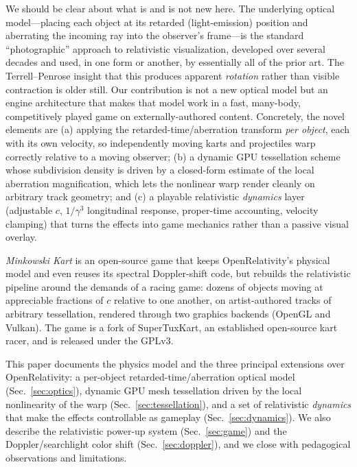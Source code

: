 \documentclass[aip,amsmath,amssymb,reprint,nofootinbib]{revtex4-2}
\begin{document}
We should be clear about what is and is not new here. The underlying optical
model---placing each object at its retarded (light-emission) position and
aberrating the incoming ray into the observer's frame---is the standard
``photographic'' approach to relativistic visualization, developed over several
decades and used, in one form or another, by essentially all of the prior
art.\cite{Hsiung1990,Weiskopf2000,Kraus2008,Savage2007,Sherin2016} The
Terrell--Penrose insight that this produces apparent \emph{rotation} rather than
visible contraction is older still.\cite{Terrell1959,Penrose1959,Weisskopf1960}
Our contribution is not a new optical model but an engine architecture that makes
that model work in a fast, many-body, competitively played game on
externally-authored content. Concretely, the novel elements are (a) applying the
retarded-time/aberration transform \emph{per object}, each with its own velocity,
so independently moving karts and projectiles warp correctly relative to a moving
observer; (b) a dynamic GPU tessellation scheme whose subdivision density is
driven by a closed-form estimate of the local aberration magnification, which lets
the nonlinear warp render cleanly on arbitrary track geometry; and (c) a playable
relativistic \emph{dynamics} layer (adjustable $c$, $1/\gamma^3$ longitudinal
response, proper-time accounting, velocity clamping) that turns the effects into
game mechanics rather than a passive visual overlay.

\emph{Minkowski Kart} is an open-source game that keeps OpenRelativity's
physical model and even reuses its spectral Doppler-shift code, but rebuilds the
relativistic pipeline around the demands of a racing game: dozens of objects
moving at appreciable fractions of $c$ relative to one another, on artist-authored
tracks of arbitrary tessellation, rendered through two graphics backends
(OpenGL and Vulkan). The game is a fork of
SuperTuxKart\cite{STK}, an established open-source kart racer, and is released
under the GPLv3.

This paper documents the physics model and the three principal extensions over
OpenRelativity: a per-object retarded-time/aberration optical model
(Sec.~\ref{sec:optics}), dynamic GPU mesh tessellation driven by the local
nonlinearity of the warp (Sec.~\ref{sec:tessellation}), and a set of relativistic
\emph{dynamics} that make the effects controllable as gameplay
(Sec.~\ref{sec:dynamics}). We also describe the relativistic power-up system
(Sec.~\ref{sec:game}) and the Doppler/searchlight color shift
(Sec.~\ref{sec:doppler}), and we close with pedagogical observations and
limitations.
\end{document}

